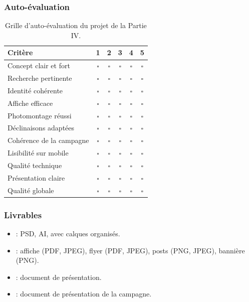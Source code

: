\subsubsection*{Auto-évaluation}

\begin{table}[h!]
\centering
\begin{tabular}{@{}lccccc@{}}
\toprule
\textbf{Critère} & \textbf{1} & \textbf{2} & \textbf{3} & \textbf{4} & \textbf{5} \\
\midrule
Concept clair et fort & \(\square\) & \(\square\) & \(\square\) & \(\square\) & \(\square\) \\
Recherche pertinente & \(\square\) & \(\square\) & \(\square\) & \(\square\) & \(\square\) \\
Identité cohérente & \(\square\) & \(\square\) & \(\square\) & \(\square\) & \(\square\) \\
Affiche efficace & \(\square\) & \(\square\) & \(\square\) & \(\square\) & \(\square\) \\
Photomontage réussi & \(\square\) & \(\square\) & \(\square\) & \(\square\) & \(\square\) \\
Déclinaisons adaptées & \(\square\) & \(\square\) & \(\square\) & \(\square\) & \(\square\) \\
Cohérence de la campagne & \(\square\) & \(\square\) & \(\square\) & \(\square\) & \(\square\) \\
Lisibilité sur mobile & \(\square\) & \(\square\) & \(\square\) & \(\square\) & \(\square\) \\
Qualité technique & \(\square\) & \(\square\) & \(\square\) & \(\square\) & \(\square\) \\
Présentation claire & \(\square\) & \(\square\) & \(\square\) & \(\square\) & \(\square\) \\
Qualité globale & \(\square\) & \(\square\) & \(\square\) & \(\square\) & \(\square\) \\
\bottomrule
\end{tabular}
\caption{Grille d'auto-évaluation du projet de la Partie IV.}
\end{table}

\subsubsection*{Livrables}

\begin{itemize}
    \item {} : PSD, AI, avec calques organisés.
    \item {} : affiche (PDF, JPEG), flyer (PDF, JPEG), posts (PNG, JPEG), bannière (PNG).
    \item {} : document de présentation.
    \item {} : document de présentation de la campagne.
\end{itemize}

